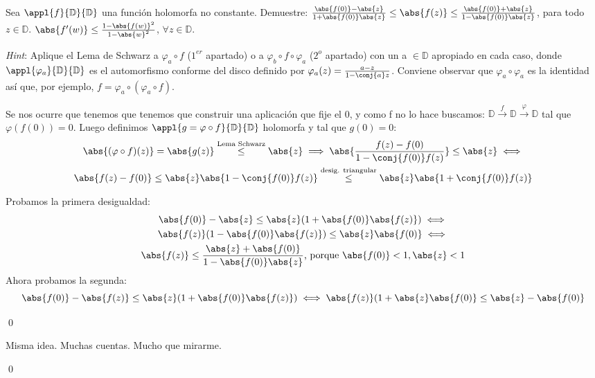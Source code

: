 \begin{problem}
Sea $\appl{f}{\mathbb{D}}{\mathbb{D}}$ una función holomorfa no constante. Demuestre:
\ppart $\frac{\abs{f(0)} - \abs{z}}{1 + \abs{f(0)}\abs{z}} \leq \abs{f(z)} \leq \frac{\abs{f(0)} + \abs{z}}{1 - \abs{f(0)}\abs{z}}$, para todo $z \in \mathbb{D}$.
\ppart $\abs{f'(w)} \leq \frac{1 - \abs{f(w)}^2}{1 - \abs{w}^2}$, $\forall z \in \mathbb{D}$.

{\it Hint}: Aplique el Lema de Schwarz a $\varphi_a \circ f$ ($1^{er}$ apartado) o a $\varphi_b \circ f \circ \varphi_a$ ($2^o$ apartado) con un a $\in \mathbb{D}$ apropiado en cada caso, donde $\appl{\varphi_a}{\mathbb{D}}{\mathbb{D}}$ es el automorfismo conforme del disco definido por $\varphi_a(z) = \frac{a - z}{1 - \conj{a} z}$. Conviene observar que $\varphi_a \circ \varphi_a$ es la identidad así que, por ejemplo, $f = \varphi_a \circ (\varphi_a \circ f)$.
\solution

\spart
Se nos ocurre que tenemos que tenemos que construir una aplicación que fije el 0, y como f no lo hace buscamos: $\mathbb{D}\xrightarrow{f}\mathbb{D}\xrightarrow{\varphi}\mathbb{D}$ tal que $\varphi(f(0)) = 0$.
Luego definimos $\appl{g = \varphi \circ f}{\mathbb{D}}{\mathbb{D}}$ holomorfa y tal que $g(0) = 0$:
\begin{gather*}
\abs{(\varphi \circ f)(z)} = \abs{g(z)} \stackrel{\text{Lema Schwarz}}{\leq} \abs{z} \implies \abs{\frac{f(z) - f(0)}{1 - \conj{f(0)} f(z)}} \leq \abs{z} \iff \\
\abs{f(z) - f(0)} \leq \abs{z} \abs{1 - \conj{f(0)} f(z)} \stackrel{\text{desig. triangular}}{\leq} \abs{z} \abs{1 + \conj{f(0)} f(z)}
\end{gather*}

Probamos la primera desigualdad:
\begin{gather*}
\abs{f(0)} - \abs{z} \leq \abs{z}(1 + \abs{f(0)}\abs{f(z)}) \iff\\
\abs{f(z)}(1 - \abs{f(0)}\abs{f(z)}) \leq \abs{z} \abs{f(0)} \iff\\
\abs{f(z)} \leq \frac{\abs{z} + \abs{f(0)}}{1 - \abs{f(0)}\abs{z}} \text{, porque } \abs{f(0)} < 1, \abs{z} < 1
\end{gather*}
Ahora probamos la segunda:
\[ \abs{f(0)} - \abs{f(z)} \leq \abs{z}(1 + \abs{f(0)}\abs{f(z)}) \iff \abs{f(z)} (1 + \abs{z}\abs{f(0)} \leq \abs{z} - \abs{f(0)} \]

$ $\hfill\qed

\spart
Misma idea. Muchas cuentas. Mucho que mirarme.

$ $\hfill\qed
\end{problem}

